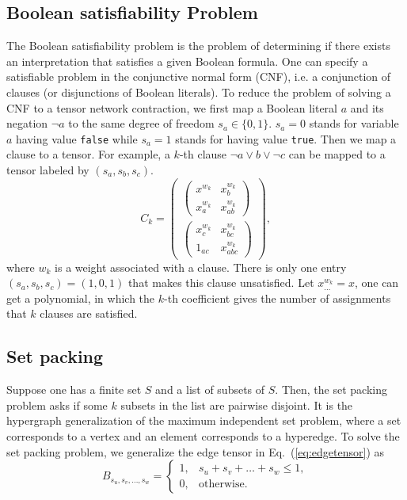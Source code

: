 \documentclass[onefignum, onetabnum]{siamart190516}
\newcommand{\<}{\langle}
\renewcommand{\>}{\rangle}
\newcommand{\Eq}[1]{Eq.~(\ref{#1})}
\newcounter{example}
\begin{document}
\subsection{Boolean satisfiability Problem}
The Boolean satisfiability problem is the problem of determining if there exists an interpretation that satisfies a given Boolean formula.
One can specify a satisfiable problem in the conjunctive normal form (CNF), i.e. a conjunction of clauses (or disjunctions of Boolean literals).
To reduce the problem of solving a CNF to a tensor network contraction, we first map a Boolean literal $a$ and its negation $\neg a$ to the same degree of freedom $s_a \in \{0, 1\}$.
$s_a = 0$ stands for variable $a$ having value \texttt{false} while $s_a=1$ stands for having value \texttt{true}.
Then we map a clause to a tensor. For example, a $k$-th clause $\neg a \vee b \vee \neg c$ can be mapped to a tensor labeled by $(s_a, s_b, s_c)$.
\begin{equation}
C_{k} = \left(\begin{matrix}
\left(\begin{matrix}
x^{w_k} & x_{b}^{w_k} \\
x_a^{w_k} & x_{ab}^{w_k}
\end{matrix}\right) \\
\left(\begin{matrix}
x_{c}^{w_k} & x_{bc}^{w_k} \\
1_{ac} & x_{abc}^{w_k}
\end{matrix}\right)
\end{matrix}\right),
\end{equation}
where $w_k$ is a weight associated with a clause. There is only one entry $(s_a, s_b, s_c) = (1, 0, 1)$ that makes this clause unsatisfied.
Let $x^{w_k}_{\ldots} = x$, one can get a polynomial, in which the $k$-th coefficient gives the number of assignments that $k$ clauses are satisfied.

\subsection{Set packing}
Suppose one has a finite set $S$ and a list of subsets of $S$. Then, the set packing problem asks if some $k$ subsets in the list are pairwise disjoint.
It is the hypergraph generalization of the maximum independent set problem, where a set corresponds to a vertex and an element corresponds to a hyperedge.
To solve the set packing problem, we generalize the edge tensor in \Eq{eq:edgetensor} as
\begin{equation}
    B_{s_u,s_v,\ldots, s_w} = \begin{cases}
        1, & s_u+s_v+\ldots+s_w\leq 1,\\
        0, & \text{otherwise}.
    \end{cases}
\end{equation}
\end{document}
